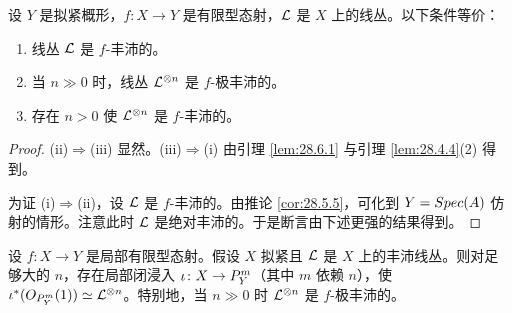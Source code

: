 \begin{proposition}\label{prop:28.6.2}
设 $Y$ 是拟紧概形，$f\colon X\to Y$ 是有限型态射，$\mathcal{L}$ 是 $X$ 上的线丛。以下条件等价：
\begin{enumerate}[label=(\roman*),leftmargin=2.6em,itemsep=0.3ex]
  \item 线丛 $\mathcal{L}$ 是 $f$-丰沛的。
  \item 当 $n\gg 0$ 时，线丛 $\mathcal{L}^{\otimes n}$ 是 $f$-极丰沛的。
  \item 存在 $n>0$ 使 $\mathcal{L}^{\otimes n}$ 是 $f$-丰沛的。
\end{enumerate}
\end{proposition}

\begin{proof}
(ii)$\Rightarrow$(iii) 显然。(iii)$\Rightarrow$(i) 由引理 \ref{lem:28.6.1} 与引理 \ref{lem:28.4.4}(2) 得到。

为证 (i)$\Rightarrow$(ii)，设 $\mathcal{L}$ 是 $f$-丰沛的。由推论 \ref{cor:28.5.5}，可化到 $Y=Spec(A)$ 仿射的情形。注意此时 $\mathcal{L}$ 是绝对丰沛的。于是断言由下述更强的结果得到。
\end{proof}

\begin{lemma}\label{lem:28.6.3}
设 $f\colon X\to Y$ 是局部有限型态射。假设 $X$ 拟紧且 $\mathcal{L}$ 是 $X$ 上的丰沛线丛。则对足够大的 $n$，存在局部闭浸入 $\iota\colon X\to P^m_Y$（其中 $m$ 依赖 $n$），使 $\iota^*(O_{P^m_Y}(1))\simeq\mathcal{L}^{\otimes n}$。特别地，当 $n\gg 0$ 时 $\mathcal{L}^{\otimes n}$ 是 $f$-极丰沛的。
\end{lemma}

